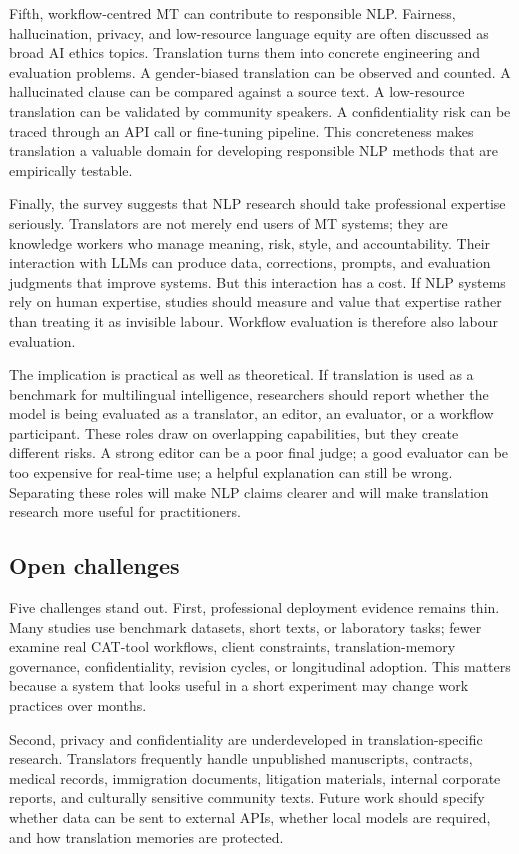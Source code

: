 \documentclass[11pt]{article}
\begin{document}
Fifth, workflow-centred MT can contribute to responsible NLP. Fairness, hallucination, privacy, and low-resource language equity are often discussed as broad AI ethics topics. Translation turns them into concrete engineering and evaluation problems. A gender-biased translation can be observed and counted. A hallucinated clause can be compared against a source text. A low-resource translation can be validated by community speakers. A confidentiality risk can be traced through an API call or fine-tuning pipeline. This concreteness makes translation a valuable domain for developing responsible NLP methods that are empirically testable.

Finally, the survey suggests that NLP research should take professional expertise seriously. Translators are not merely end users of MT systems; they are knowledge workers who manage meaning, risk, style, and accountability. Their interaction with LLMs can produce data, corrections, prompts, and evaluation judgments that improve systems. But this interaction has a cost. If NLP systems rely on human expertise, studies should measure and value that expertise rather than treating it as invisible labour. Workflow evaluation is therefore also labour evaluation.

The implication is practical as well as theoretical. If translation is used as a benchmark for multilingual intelligence, researchers should report whether the model is being evaluated as a translator, an editor, an evaluator, or a workflow participant. These roles draw on overlapping capabilities, but they create different risks. A strong editor can be a poor final judge; a good evaluator can be too expensive for real-time use; a helpful explanation can still be wrong. Separating these roles will make NLP claims clearer and will make translation research more useful for practitioners.

\subsection{Open challenges}
Five challenges stand out. First, professional deployment evidence remains thin. Many studies use benchmark datasets, short texts, or laboratory tasks; fewer examine real CAT-tool workflows, client constraints, translation-memory governance, confidentiality, revision cycles, or longitudinal adoption. This matters because a system that looks useful in a short experiment may change work practices over months.

Second, privacy and confidentiality are underdeveloped in translation-specific research. Translators frequently handle unpublished manuscripts, contracts, medical records, immigration documents, litigation materials, internal corporate reports, and culturally sensitive community texts. Future work should specify whether data can be sent to external APIs, whether local models are required, and how translation memories are protected.
\end{document}
